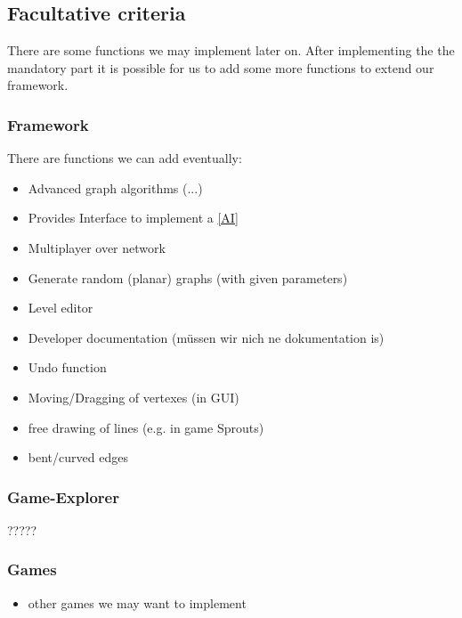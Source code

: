 \subsection{Facultative criteria}
There are some functions we may implement later on. After implementing the the mandatory part it is possible for us to add some more functions to extend our framework.

\subsubsection{Framework}
There are functions we can add eventually: 
\begin{itemize}
\item Advanced graph algorithms (...)
\item Provides Interface to implement a \ref{AI} 
\item Multiplayer over network
\item Generate random (planar) graphs (with given parameters)
\item Level editor
\item Developer documentation (müssen wir nich ne dokumentation is)
\item Undo function
\item Moving/Dragging of vertexes (in GUI)
\item free drawing of lines (e.g. in game Sprouts)
\item bent/curved edges
\end{itemize}


\subsubsection{Game-Explorer}
?????

\subsubsection{Games}
\begin{itemize}
\item other games we may want to implement
\end{itemize}